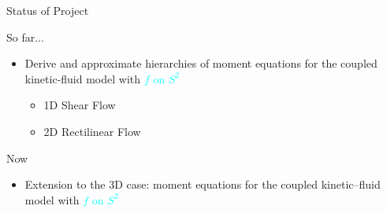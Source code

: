 
\begin{frame}{Status of Project}
	\scriptsize
	\begin{block}{So far...}
		\begin{itemize}
		   \item <1-> Derive and approximate hierarchies of moment equations for the coupled kinetic-fluid model with \textcolor{cyan}{$f$ on $S^2$}
		   \begin{itemize}
			  \item  1D Shear Flow
		  	  \item  2D Rectilinear Flow
		   \end{itemize}
		\end{itemize}
	\end{block}
	\begin{block}{Now}
		\begin{itemize}
			\item <2-> Extension to the 3D case: moment equations for the coupled kinetic–fluid model with \textcolor{cyan}{$f$ on $S^2$}
		\end{itemize}
	\end{block}
\end{frame}





